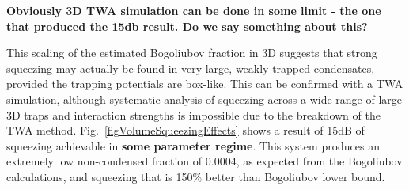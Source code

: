 \documentclass{iopart}
\begin{document}
\textbf{Obviously 3D TWA simulation can be done in some limit - the one that produced the 15db result.  Do we say something about this?} 

This scaling of the estimated Bogoliubov fraction in 3D suggests that strong squeezing may actually be found in very large, weakly trapped condensates, provided the trapping potentials are box-like.  This can be confirmed with a TWA simulation, although systematic analysis of squeezing across a wide range of large 3D traps and interaction strengths is impossible due to the breakdown of the TWA method.  Fig.~\ref{figVolumeSqueezingEffects} shows a result of 15dB of squeezing achievable in \textbf{some parameter regime}.  This system produces an extremely low non-condensed fraction of $0.0004$, as expected from the Bogoliubov calculations, and squeezing that is 150\% better than Bogoliubov lower bound.  




\end{document}
